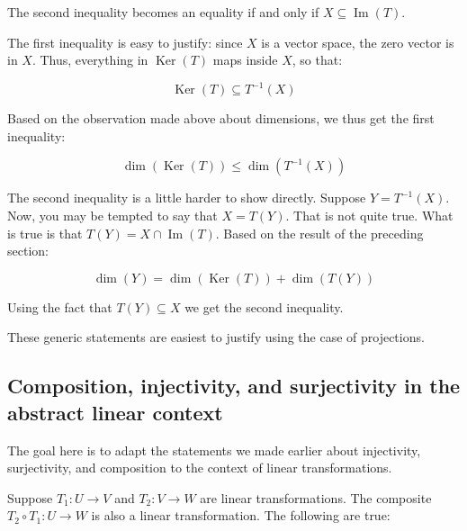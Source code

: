 \documentclass[10pt]{amsart}
\begin{document}
The second inequality becomes an equality if and only if $X \subseteq
\operatorname{Im}(T)$.

The first inequality is easy to justify: since $X$ is a vector space,
the zero vector is in $X$. Thus, everything in $\operatorname{Ker}(T)$
maps inside $X$, so that:

$$\operatorname{Ker}(T) \subseteq T^{-1}(X)$$

Based on the observation made above about dimensions, we thus get the
first inequality:

$$\operatorname{dim}(\operatorname{Ker}(T)) \le \operatorname{dim}(T^{-1}(X))$$

The second inequality is a little harder to show directly. Suppose $Y
= T^{-1}(X)$. Now, you may be tempted to say that $X = T(Y)$. That is
not quite true. What is true is that $T(Y) = X \cap
\operatorname{Im}(T)$. Based on the result of the preceding section:

$$\operatorname{dim}(Y) = \operatorname{dim}(\operatorname{Ker}(T)) + \operatorname{dim}(T(Y))$$

Using the fact that $T(Y) \subseteq X$ we get the second inequality.

These generic statements are easiest to justify using the case of
projections.

\subsection{Composition, injectivity, and surjectivity in the abstract linear context}

The goal here is to adapt the statements we made earlier about
injectivity, surjectivity, and composition to the context of linear
transformations.

Suppose $T_1: U \to V$ and $T_2:V \to W$ are linear
transformations. The composite $T_2 \circ T_1: U \to W$ is also a
linear transformation. The following are true:
\end{document}
